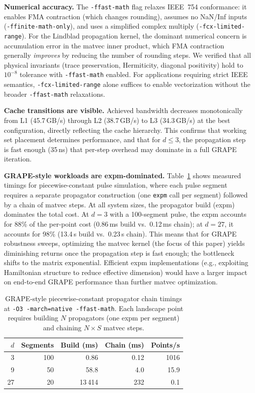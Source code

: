 \documentclass[a4paper,noarxiv]{quantumarticle}
\begin{document}
\textbf{Numerical accuracy.}
The \texttt{-ffast-math} flag relaxes IEEE~754 conformance: it enables
FMA contraction (which changes rounding), assumes no NaN/Inf inputs
(\texttt{-ffinite-math-only}), and uses a simplified complex multiply
(\texttt{-fcx-limited-range}). For the Lindblad propagation kernel, the
dominant numerical concern is accumulation error in the matvec inner
product, which FMA contraction generally \emph{improves} by reducing the
number of rounding steps. We verified that all physical invariants
(trace preservation, Hermiticity, diagonal positivity) hold to $10^{-8}$
tolerance with \texttt{-ffast-math} enabled. For applications requiring
strict IEEE semantics, \texttt{-fcx-limited-range} alone suffices to
enable vectorization without the broader \texttt{-ffast-math} relaxations.

\textbf{Cache transitions are visible.}
Achieved bandwidth decreases monotonically from L1 (45.7\,GB/s) through
L2 (38.7\,GB/s) to L3 (34.3\,GB/s) at the best configuration, directly
reflecting the cache hierarchy. This confirms that working set placement
determines performance, and that for $d \leq 3$, the propagation step is
fast enough (35\,ns) that per-step overhead may dominate in a full GRAPE
iteration.

\textbf{GRAPE-style workloads are expm-dominated.}
Table~\ref{tab:grape} shows measured timings for piecewise-constant
pulse simulation, where each pulse segment requires a separate propagator
construction (one \texttt{expm} call per segment) followed by a chain of
matvec steps. At all system sizes, the propagator build (expm) dominates
the total cost. At $d = 3$ with a 100-segment pulse, the expm accounts
for 88\% of the per-point cost (0.86\,ms build vs.\ 0.12\,ms chain); at
$d = 27$, it accounts for 98\% (13.4\,s build vs.\ 0.23\,s chain). This
means that for GRAPE robustness sweeps, optimizing the matvec kernel
(the focus of this paper) yields diminishing returns once the
propagation step is fast enough; the bottleneck shifts to the matrix
exponential. Efficient expm implementations (e.g., exploiting Hamiltonian
structure to reduce effective dimension) would have a larger impact on
end-to-end GRAPE performance than further matvec optimization.

\begin{table}[h]
  \centering
  \caption{GRAPE-style piecewise-constant propagator chain timings at
           \texttt{-O3 -march=native -ffast-math}. Each landscape point
           requires building $N$ propagators (one expm per segment) and
           chaining $N \times S$ matvec steps.}
  \label{tab:grape}
  \begin{tabular}{@{}rrrrr@{}}
    \toprule
    $d$ & Segments & Build (ms) & Chain (ms) & Points/s \\
    \midrule
    3  & 100 & 0.86   & 0.12   & 1016 \\
    9  & 50  & 58.8   & 4.0    & 15.9 \\
    27 & 20  & 13\,414 & 232   & 0.1 \\
    \bottomrule
  \end{tabular}
\end{table}
\end{document}
